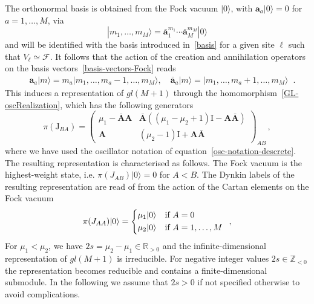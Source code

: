 \documentclass[11pt]{article}
\numberwithin{equation}{section}
\newcommand{\oa}{\mathbf{a}}
\newcommand{\oad}{\mathbf{\bar{a}}}
\newcommand{\of}{\mathbf{a}}
\newcommand{\ofd}{\mathbf{\bar{a}}}
\newcommand{\OA}{\mathbf{A}}
\newcommand{\OAD}{\mathbf{\bar{A}}}
\newcommand{\mmu}{\mu}
\newcommand{\M}{M}
\newcommand{\ID}{\mathrm{I}}
\begin{document}
The {orthonormal} basis is
obtained from the Fock vacuum $|0\rangle$, with $\of_a|0\rangle=0$ for $a=1,\ldots,M$,
via
\begin{equation}\label{basis-vectors-Fock}
|m_1,\ldots,m_M\rangle=\ofd_1^{m_1}\cdots \ofd_M^{m_M}|0\rangle
\end{equation}
and will be identified with the basis introduced in~\eqref{basis} for a given site $\ell$ such that $V_\ell\simeq \mathcal{F}$. It follows that the action of the creation and annihilation operators on the basis vectors~\eqref{basis-vectors-Fock} reads
\begin{equation}\label{discrete-representation}
\begin{split}
	&\oa_{a}|m\rangle=m_{a}|m_{1},\ldots,m_{a}-1,\ldots,m_{\M}\rangle,\quad
    \oad_a|m\rangle=|m_{1},\ldots,m_{a}+1,\ldots,m_{\M}\rangle
    \end{split}\,.
\end{equation}
This induces a representation of $gl(M+1)$ through the homomorphism~\eqref{GL-oscRealization}, which has the following generators
\begin{equation}\label{E-matrix}
		\pi(\mathrm{J}_{BA})=\left(\begin{array}{cc}
			\mmu_1-\OAD\OA&\OAD\left((\mmu_1-\mmu_2+1)\ID-\OA\OAD\right)\\
			\OA&(\mmu_2-1)\ID+\OA\OAD
		\end{array}\right) _{AB}\,,
	\end{equation}
    where we have used the oscillator notation of equation~\eqref{osc-notation-descrete}. 
The resulting representation is characterised as follows. The Fock vacuum is the highest-weight state, i.e.  $\pi(J_{AB})|0\rangle=0$ for $A<B$. The Dynkin labels of the resulting representation  are read of from the action of the Cartan elements on the Fock vacuum
    \begin{equation}\label{HW-discreteReps}
        \pi(J_{AA})|0\rangle=\begin{cases*}
                    \mu_1|0\rangle & if  $A =0$  \\
                     \mu_2|0\rangle & if $A=1,\ldots,M$
                 \end{cases*}\,,
    \end{equation}
For $\mu_1< \mu_2$, we have $2s=\mu_2-\mu_1\in \mathbb{R}_{>0}$ and the infinite-dimensional representation of $gl(M+1)$ is irreducible. For negative integer values $2s\in \mathbb{Z}_{<0}$ the representation becomes reducible and contains a finite-dimensional submodule. In the following we assume that $2s>0$ if not specified otherwise to avoid complications.
\end{document}
